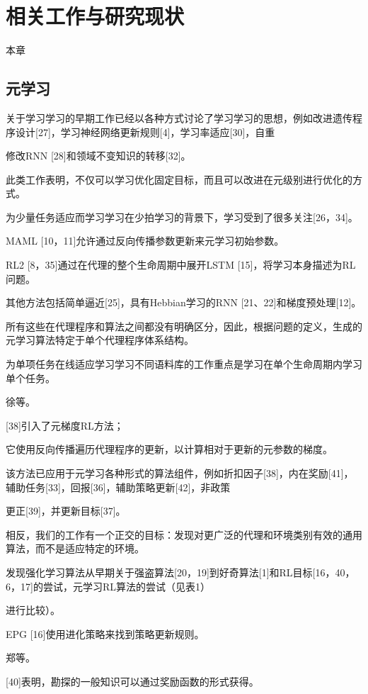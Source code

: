 \chapter{相关工作与研究现状}
\label{cha:sysu-thesis-latex-install-guide}

本章


\section{元学习}


关于学习学习的早期工作已经以各种方式讨论了学习学习的思想，例如改进遗传程序设计[27]，学习神经网络更新规则[4]，学习率适应[30]，自重

修改RNN [28]和领域不​​变知识的转移[32]。

此类工作表明，不仅可以学习优化固定目标，而且可以改进在元级别进行优化的方式。

为少量任务适应而学习学习在少拍学习的背景下，学习受到了很多关注[26，34]。 

MAML [10，11]允许通过反向传播参数更新来元学习初始参数。 

RL2 [8，35]通过在代理的整个生命周期中展开LSTM [15]，将学习本身描述为RL问题。

其他方法包括简单逼近[25]，具有Hebbian学习的RNN [21、22]和梯度预处理[12]。

所有这些在代理程序和算法之间都没有明确区分，因此，根据问题的定义，生成的元学习算法特定于单个代理程序体系结构。

为单项任务在线适应学习学习不同语料库的工作重点是学习在单个生命周期内学习单个任务。

徐等。 

[38]引入了元梯度RL方法；

它使用反向传播遍历代理程序的更新，以计算相对于更新的元参数的梯度。

该方法已应用于元学习各种形式的算法组件，例如折扣因子[38]，内在奖励[41]，辅助任务[33]，回报[36]，辅助策略更新[42]，非政策

更正[39]，并更新目标[37]。

相反，我们的工作有一个正交的目标：发现对更广泛的代理和环境类别有效的通用算法，而不是适应特定的环境。

发现强化学习算法从早期关于强盗算法[20，19]到好奇算法[1]和RL目标[16，40，6，17]的尝试，元学习RL算法的尝试（见表1）

进行比较）。 

EPG [16]使用进化策略来找到策略更新规则。

郑等。 

[40]表明，勘探的一般知识可以通过奖励函数的形式获得。 

